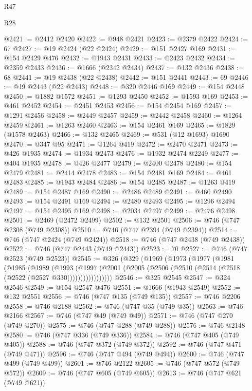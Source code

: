 \begin{lexlean}{R47}
\begin{lexlean}{R28}
\begin{coremodule}
{{{{{{{{{{{{{{{{{{{{{{{{{{{{{{{{{{{{{{{{{{{{{{{{{{{{{{{{{{{{{{{{{{{{{{{{{{{{{{{{{{{{{{{{{{{{{{{{{{{{{{{{{{{{{{{{{{{{{{{{{{{{{{{{{{{{{@2421 := @2412 @2420
@2422 := @948 @2421
@2423 := @2379 @2422
@2424 := 67
@2427 := @19 @2424 (@22 @2424)
@2429 := @151 @2427 @169
@2431 := @154 @2429 @476
@2432 := @1943 @2431
@2433 := @2423 @2432
@2434 := @2359 @2433
@2436 := @1666 (@2342 @2434)
@2437 := @132 @2436
@2438 := 68
@2441 := @19 @2438 (@22 @2438)
@2442 := @151 @2441
@2443 := 69
@2446 := @19 @2443 (@22 @2443)
@2448 := @320 @2446 @169
@2449 := @154 @2448
@2450 := @1882 @1572
@2451 := @1293 @2450
@2452 := @1593 @169
@2453 := @461 @2452
@2454 := @2451 @2453
@2456 := @154 @2454 @169
@2457 := @1291 @2456
@2458 := @2449 @2457
@2459 := @2442 @2458
@2460 := @1264 @2459
@2461 := @1263 @2460
@2463 := @154 @2461 @169
@2465 := @1829 (@1578 @2463)
@2466 := @132 @2465
@2469 := @531 (@12 @1693) @1690
@2470 := @347 @95
@2471 := @1264 @419
@2472 := @2470 @2471
@2473 := @426 @1935
@2474 := @1934 @2473
@2476 := @1932 @2474 @2249
@2477 := @404 @1935
@2478 := @426 @2477
@2479 := @2400 @2478
@2480 := @154 @2479
@2481 := @2414 @2478
@2483 := @154 @2481 @169
@2484 := @461 @2483
@2485 := @1943 @2484
@2486 := @154 @2485
@2487 := @1263 @419
@2489 := @154 @2487 @169
@2490 := @2486 @2489
@2491 := @460 @2490
@2493 := @154 @2491 @169
@2494 := @2480 @2493
@2495 := @1296 @2494
@2497 := @154 @2495 @169
@2498 := @2034 @2497
@2499 := @2476 @2498
@2501 := @2469 (@2472 @2499)
@2502 := @132 @2501
@2506 := @746 (@747 @2308 (@749 @2308))
@2510 := @746 (@747 @2394 (@749 @2394))
@2514 := @746 (@747 @2424 (@749 @2424))
@2518 := @746 (@747 @2438 (@749 @2438))
@2522 := @746 (@747 @2443 (@749 @2443))
@2523 := 70
@2527 := @746 (@747 @2523 (@749 @2523))
@2545 := @326
    (@329
      (@1969
        (@1973
          (@1977
            (@1981
              (@1985
                (@1989
                  (@1993
                    (@1997
                      (@2001 (@2005 (@2506 (@2510 (@2514 (@2518 (@2522 (@2527 @330)))))))))))))))))
@2546 := @325 @2545
@2547 := @324 @2546
@2549 := @154 @2547 @476
@2551 := @1666 (@1943 @2549)
@2552 := @132 @2551
@2556 := @746 (@747 @135 (@749 @135))
@2557 := @746 @2206
@2558 := @746 @2188
@2562 := @746 (@747 @35 (@749 @35))
@2563 := @746 @2166
@2567 := @746 (@747 @49 (@749 @49))
@2571 := @746 (@747 @270 (@749 @270))
@2575 := @746 (@747 @288 (@749 @288))
@2576 := @746 @2148
@2580 := @746 (@747 @336 (@749 @336))
@2584 := @746 (@747 @405 (@749 @405))
@2588 := @746 (@747 @372 (@749 @372))
@2592 := @746 (@747 @471 (@749 @471))
@2596 := @746 (@747 @494 (@749 @494))
@2600 := @746 (@747 @499 (@749 @499))
@2601 := @746 @2122
@2605 := @746 (@747 @572 (@749 @572))
@2609 := @746 (@747 @605 (@749 @605))
@2613 := @746 (@747 @621 (@749 @621))
}}}}}}}}}}}}}}}}}}}}}}}}}}}}}}}}}}}}}}}}}}}}}}}}}}}}}}}}}}}}}}}}}}}}}}}}}}}}}}}}}}}}}}}}}}}}}}}}}}}}}}}}}}}}}}}}}}}}}}}}}}}}}}}}}}}}}
\end{coremodule}
\end{lexlean}
\end{lexlean}
